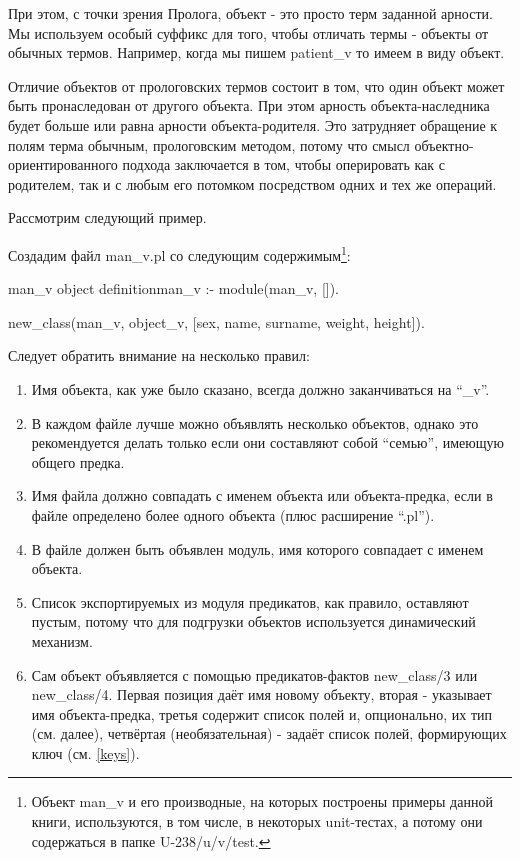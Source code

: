 \documentclass[a4paper]{book}
\begin{document}
При этом, с точки зрения Пролога, объект - это просто терм
заданной арности. Мы используем особый суффикс для того, чтобы
отличать термы - объекты от обычных термов. Например, когда мы
пишем patient_v то имеем в виду объект. 

Отличие объектов от прологовских термов состоит в том, что один
объект может быть пронаследован от другого объекта. При этом
арность объекта-наследника будет больше или равна арности
объекта-родителя. Это затрудняет обращение к полям терма обычным,
прологовским методом, потому что смысл объектно-ориентированного
подхода заключается в том, чтобы оперировать как с родителем, так
и с любым его потомком посредством одних и тех же операций.

Рассмотрим следующий пример.

Создадим файл man_v.pl со следующим содержимым\footnote{Объект man_v и его
  производные, на которых построены примеры данной книги, используются, в том
  числе, в некоторых unit-тестах, а потому они содержаться в папке U-238/u/v/test.}:

\begin{example}{man_v object definition}{man_v}
:- module(man_v, []).

new_class(man_v, object_v, 
          [sex, name, surname, weight, height]).
\end{example}

Следует обратить внимание на несколько правил:

\begin{enumerate}
\item Имя объекта, как уже было сказано, всегда должно
  заканчиваться на ``_v''.
\item В каждом файле лучше можно объявлять несколько объектов, однако это
  рекомендуется делать только если они составляют собой ``семью'', имеющую
  общего предка.
\item Имя файла должно совпадать с именем объекта или объекта-предка, если в
  файле определено более одного объекта (плюс расширение ``.pl'').
\item В файле должен быть объявлен модуль, имя которого совпадает
  с именем объекта.
\item Список экспортируемых из модуля предикатов, как правило,
  оставляют пустым, потому что для подгрузки объектов
  используется динамический механизм.
\item Сам объект объявляется с помощью предикатов-фактов
  new_class/3 или new_class/4. Первая позиция даёт имя новому
  объекту, вторая - указывает имя объекта-предка, третья содержит
  список полей и, опционально, их тип (см. далее), четвёртая
  (необязательная) - задаёт список полей, формирующих ключ
  (см. \ref{keys}).
\end{enumerate}
\end{document}
